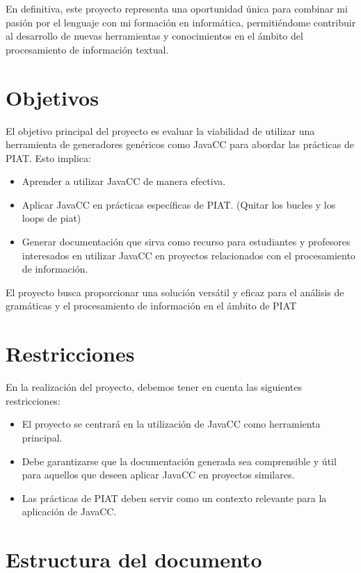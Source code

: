 En definitiva, este proyecto representa una oportunidad única para combinar mi pasión por el lenguaje con mi formación en informática, permitiéndome contribuir al desarrollo de nuevas herramientas y conocimientos en el ámbito del procesamiento de información textual.

\section{Objetivos}

El objetivo principal del proyecto es evaluar la viabilidad de utilizar una herramienta de generadores genéricos como JavaCC para abordar las prácticas de PIAT. 
Esto implica: 
\begin{itemize}
    \item Aprender a utilizar JavaCC de manera efectiva. 
    \item Aplicar JavaCC en prácticas específicas de PIAT. (Quitar los bucles y los loops de piat) 
    \item Generar documentación que sirva como recurso para estudiantes y profesores interesados en utilizar JavaCC en proyectos relacionados con el procesamiento de información. 
\end{itemize}

El proyecto busca proporcionar una solución versátil y eficaz para el análisis de gramáticas y el procesamiento de información en el ámbito de PIAT

\section{Restricciones}
	En la realización del proyecto, debemos tener en cuenta las siguientes restricciones:
\begin{itemize}
    \item El proyecto se centrará en la utilización de JavaCC como herramienta principal. 
    \item Debe garantizarse que la documentación generada sea comprensible y útil para aquellos que deseen aplicar JavaCC en proyectos similares.
    \item Las prácticas de PIAT deben servir como un contexto relevante para la aplicación de JavaCC.
\end{itemize}

\section{Estructura del documento}